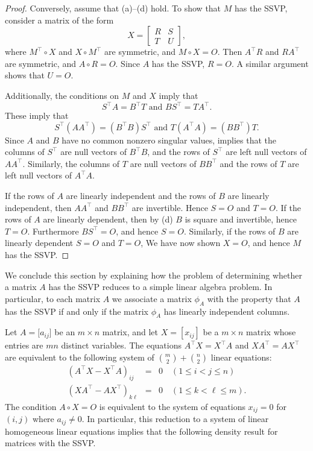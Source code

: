 \documentclass[preprint,12pt]{elsarticle}
\newcommand{\trans  }{^\top}
\begin{document}
\begin{proof}
Conversely, assume that (a)--(d) hold.  To show that $M$ has the SSVP, consider a matrix of the form 
\[ 
X= \left[ 
\begin{array}{cc}
R & S \\
T & U 
\end{array} 
\right],
\]
where $M\trans \circ X$ and $X \circ M\trans$ are symmetric, and $M\circ X=O$.
Then $A\trans R$ and $R A\trans$ are symmetric, and $A \circ R=O$. 
Since $A$ has the SSVP, $R=O$.  A similar argument shows that $U=O$.

Additionally, the conditions on $M$ and $X$ imply that 
\[ S\trans A= B\trans T \mbox{ and } B  S\trans = T A\trans.
\]
These imply that 
\[
S\trans (AA\trans) = (B\trans B) S\trans \mbox{ and }  T (A\trans A)= (B B\trans) T.  
\]
Since $A$ and $B$ have no common nonzero singular values,  implies that 
the columns of $S\trans$ are null vectors of $B\trans B$, and the rows of $S\trans$ are left null vectors 
of $AA\trans$.  Similarly, the columns of $T$ are null vectors of $BB\trans$ and the rows of $T$
are left null vectors of $A\trans A$.

If the rows of $A$ are linearly independent and the rows of $B$ are linearly independent, 
then $AA\trans$ and $BB\trans$ are invertible. Hence $S=O$ and $T=O$.
If the rows of $A$ are linearly dependent, then by (d) $B$ is square and invertible, 
hence $T=O$. Furthermore $BS\trans=O$, and hence $S=O$. Similarly, if the rows of $B$ are linearly dependent $S=O$ and $T=O$,
We have now shown $X=O$, and hence $M$ has the SSVP. 
\end{proof} 

We conclude this section by explaining how the problem of determining whether a matrix $A$ has the SSVP reduces to a simple linear algebra problem. 
In particular, to each matrix $A$
we associate a matrix $\phi_A$ with the property that $A$ has the SSVP if and only if the matrix $\phi_A$ has linearly independent columns.

Let $A = \lbrack a_{ij}\rbrack$ be an $m\times n$ matrix, 
and let $X=[x_{ij}]$ be a $m\times n$ matrix whose entries are $mn$ distinct variables.
The  equations  $A\trans X = X\trans A$ and $XA\trans = AX\trans$ are equivalent to the following system of 
$\binom{m}{2} + \binom{n}{2}$ linear equations:
\begin{eqnarray}
\label{systemeqs1}
    (A\trans X - X\trans A)_{ij} &=& 0 \quad (1\leq i<j\leq n) \\
    \label{systemeqs2}
    (XA\trans - AX\trans)_{k \ell} &=& 0  \quad (1\leq k < \ell \leq m).
\end{eqnarray}
The condition $A\circ X=O$ is equivalent to 
the system of equations $x_{ij}=0$ for $(i,j)$ 
where $a_{ij} \neq 0$.
In particular, this reduction to a system of linear homogeneous linear equations implies that the following density 
result for matrices with the SSVP.
\end{document}

